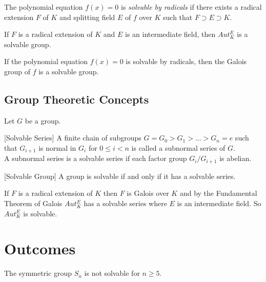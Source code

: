 \begin{definition} \cite{hunger}
  The polynomial equation \(f(x)=0\) is \textit{solvable by radicals} if there exists a radical extension \(F\) of \(K\) and splitting field \(E\) of \(f\) over \(K\) such that \(F \supset E \supset K\).
\end{definition}

\begin{theorem} \cite{hunger}
If \(F\) is a radical extension of \(K\) and \(E\) is an intermediate field, then \(Aut_K^E\) is a solvable group.
\end{theorem}

\begin{corollary} \cite{hunger}
If the polynomial equation \(f(x)=0\) is solvable by radicals, then the Galois group of \(f\) is a solvable group.
\end{corollary}
\vspace{3mm}

\subsection{Group Theoretic Concepts}
Let \(G\) be a group.

\begin{definition} \cite{hunger} [Solvable Series]
A finite chain of subgroups \(G=G_0>G_1>...>G_n={e}\) such that \(G_{i+1}\) is normal in \(G_i\) for \(0 \leq i < n\) is called a subnormal series of \(G\).\\
A subnormal series is a solvable series if each factor group \(G_i/G_{i+1}\) is abelian.
\end{definition}

\begin{definition} \cite{hunger} [Solvable Group]
 A group is solvable if and only if it has a solvable series.
\end{definition}

If \(F\) is a radical extension of \(K\) then \(F\) is Galois over \(K\) and by the Fundamental Theorem of Galois \(Aut_K^E\) has a solvable series where \(E\) is an intermediate field. So \(Aut_K^E\) is solvable.

\section{Outcomes}
\begin{theorem} \cite{hunger}
The symmetric group \(S_n\) is not solvable for \(n \geq 5\).
\end{theorem}

